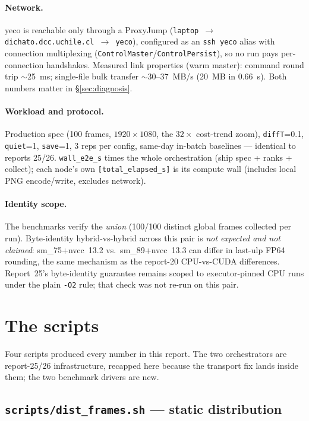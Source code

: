 \documentclass[
	english,
	letterpaper, oneside
]{article}
\begin{document}
\paragraph{Network.} yeco is reachable only through a ProxyJump
(\texttt{laptop $\to$ dichato.dcc.uchile.cl $\to$ yeco}), configured as an
\texttt{ssh yeco} alias with connection multiplexing
(\texttt{ControlMaster}/\texttt{ControlPersist}), so no run pays
per-connection handshakes. Measured link properties (warm master): command
round trip $\sim$25~ms; single-file bulk transfer $\sim$30--37~MB/s (20~MB
in $0.66$~s). Both numbers matter in \S\ref{sec:diagnosis}.

\paragraph{Workload and protocol.} Production spec (100 frames,
$1920\times1080$, the $32\times$ cost-trend zoom), \texttt{diffT}=0.1,
\texttt{quiet}=1, \texttt{save}=1, 3 reps per config, same-day in-batch
baselines --- identical to reports 25/26. \texttt{wall\_e2e\_s} times the
whole orchestration (ship spec + ranks + collect); each node's own
\texttt{[total\_elapsed\_s]} is its compute wall (includes local PNG
encode/write, excludes network).

\paragraph{Identity scope.} The benchmarks verify the \emph{union}
(100/100 distinct global frames collected per run). Byte-identity
hybrid-vs-hybrid across this pair is \emph{not expected and not claimed}:
sm\_75+nvcc~13.2 vs.\ sm\_89+nvcc~13.3 can differ in last-ulp FP64
rounding, the same mechanism as the report-20 CPU-vs-CUDA differences.
Report~25's byte-identity guarantee remains scoped to executor-pinned
CPU runs under the plain \texttt{-O2} rule; that check was not re-run on
this pair.

\section{The scripts}
\label{sec:scripts}

Four scripts produced every number in this report. The two orchestrators
are report-25/26 infrastructure, recapped here because the transport fix
lands inside them; the two benchmark drivers are new.

\subsection{\texttt{scripts/dist\_frames.sh} --- static distribution}
\label{sec:distframes}
\end{document}
